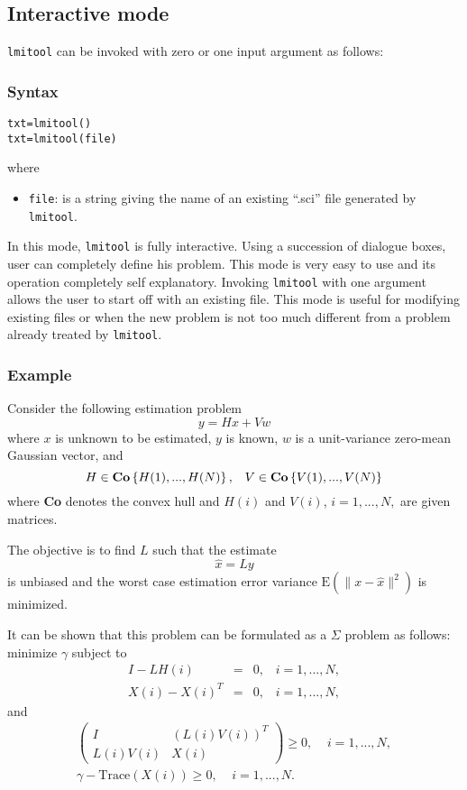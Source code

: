 \subsection{Interactive mode}
{\tt lmitool} can be invoked with zero or one input argument as
follows:

\subsubsection{Syntax}
\begin{verbatim}
txt=lmitool()
txt=lmitool(file)
\end{verbatim}
where
\begin{itemize}
\item
{\tt file}: is a string giving the name of an existing ``.sci'' file
generated by {\tt lmitool}.
\end{itemize}
In this mode, {\tt lmitool} is fully interactive. Using a succession
of dialogue boxes, user can completely define his problem. This
mode is very easy to use and its operation completely self explanatory.
Invoking {\tt lmitool} with one argument allows the user to start off 
with an existing file. This mode is useful for modifying existing files 
or when the new problem is not too much different
from a problem already treated by {\tt lmitool}.

\subsubsection{Example}
Consider the following estimation problem
\[
y = H x + V w
\]
where $x$ is unknown to be estimated, $y$ is known, $w$ is a
unit-variance zero-mean Gaussian vector, and
\[
H \in \mbox{\bf Co}\left\{ H(1),...,H(N) \right\},\;\;\;
V \in \mbox{\bf Co}\left\{ V(1),...,V(N) \right\}
\]
where {\bf Co} denotes the convex hull and $H(i)$ and $V(i)$, $i=1,...,N,$
are given matrices.

The objective is to find $L$ such that the estimate
\[
\hat{x}=Ly
\]
is unbiased and the worst case estimation error variance
$\mbox{E}(\|x-\hat{x}\|^2)$ is minimized.

It can be shown that this problem can be formulated as a $\Sigma$
problem as follows: minimize $\gamma$ subject to
\begin{eqnarray*}
I-LH(i) &=& 0 ,\;\;\;i=1,...,N,\\
X(i)-X(i)^T&=& 0,\;\;\;i=1,...,N,
\end{eqnarray*}
and
\begin{eqnarray*}
\left( \begin{array} {cc} I & (L(i)V(i))^T\\
                        L(i)V(i) & X(i) 
         \end{array}  \right)  \geq 0,\;\;\;\;i=1,...,N, \\
\gamma-\mbox{Trace}(X(i)) \geq 0,\;\;\;\;i=1,...,N.
\end{eqnarray*}

